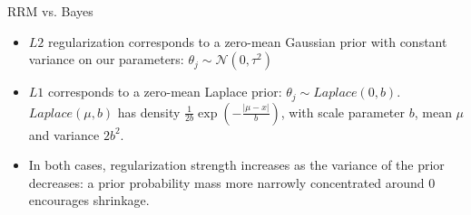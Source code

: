 \begin{vbframe} {RRM vs. Bayes}
\begin{itemize}
  \item $L2$ regularization corresponds to a zero-mean Gaussian prior with
  constant variance on our parameters:
  $\theta_j \sim \mathcal{N}(0, \tau^2)$
  \item $L1$ corresponds to a zero-mean Laplace prior:
  $\theta_j \sim \mathit{Laplace}(0,b)$.
  $\mathit{Laplace}(\mu, b)$ has density $\frac{1}{2b}\exp(-\frac{|\mu-x|}{b})$,
  with scale parameter $b$, mean $\mu$ and variance $2b^2$.
  \item In both cases, regularization strength increases as the
  variance of the prior decreases: a prior probability mass more narrowly
  concentrated around 0 encourages shrinkage.
\end{itemize}

\end{vbframe}


